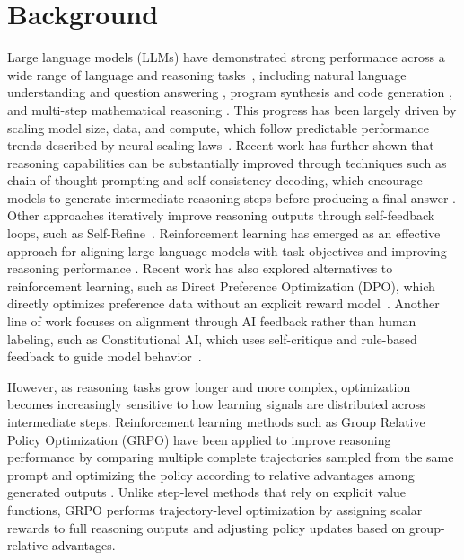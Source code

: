 \documentclass[12pt]{report}
\begin{document}
\section{Background}

Large language models (LLMs) have demonstrated strong performance across a wide range of language and reasoning tasks~\cite{chowdhery2022palmscalinglanguagemodeling, touvron2023llamaopenefficientfoundation}, including natural language understanding and question answering \cite{brown2020languagemodelsfewshotlearners,raffel2023exploringlimitstransferlearning}, program synthesis and code generation \cite{chen2021evaluatinglargelanguagemodels,nijkamp2023codegenopenlargelanguage}, and multi-step mathematical reasoning \cite{wei2023chainofthoughtpromptingelicitsreasoning,lewkowycz2022solvingquantitativereasoningproblems,shao2024deepseekmathpushinglimitsmathematical}. 
This progress has been largely driven by scaling model size, data, and compute, which follow predictable performance trends described by neural scaling laws~\cite{kaplan2020scalinglawsneurallanguage}.
Recent work has further shown that reasoning capabilities can be substantially improved through techniques such as chain-of-thought prompting and self-consistency decoding, which encourage models to generate intermediate reasoning steps before producing a final answer \cite{wei2023chainofthoughtpromptingelicitsreasoning,wang2023selfconsistencyimproveschainthought, kojima2023largelanguagemodelszeroshot}. 
Other approaches iteratively improve reasoning outputs through self-feedback loops, such as Self-Refine~\cite{madaan2023selfrefineiterativerefinementselffeedback}.
Reinforcement learning has emerged as an effective approach for aligning large language models with task objectives and improving reasoning performance \cite{ouyang2022traininglanguagemodelsfollow,schulman2017proximalpolicyoptimizationalgorithms,Guo_2025, christiano2023deepreinforcementlearninghuman, openai2024openaio1card}.
Recent work has also explored alternatives to reinforcement learning, such as Direct Preference Optimization (DPO), which directly optimizes preference data without an explicit reward model~\cite{rafailov2024directpreferenceoptimizationlanguage}.
Another line of work focuses on alignment through AI feedback rather than human labeling, such as Constitutional AI, which uses self-critique and rule-based feedback to guide model behavior~\cite{bai2022constitutionalaiharmlessnessai}.

However, as reasoning tasks grow longer and more complex, optimization becomes increasingly sensitive to how learning signals are distributed across intermediate steps. 
Reinforcement learning methods such as Group Relative Policy Optimization (GRPO) have been applied to improve reasoning performance by comparing multiple complete trajectories sampled from the same prompt and optimizing the policy according to relative advantages among generated outputs \cite{Guo_2025}. 
Unlike step-level methods that rely on explicit value functions, GRPO performs trajectory-level optimization by assigning scalar rewards to full reasoning outputs and adjusting policy updates based on group-relative advantages.
\end{document}
